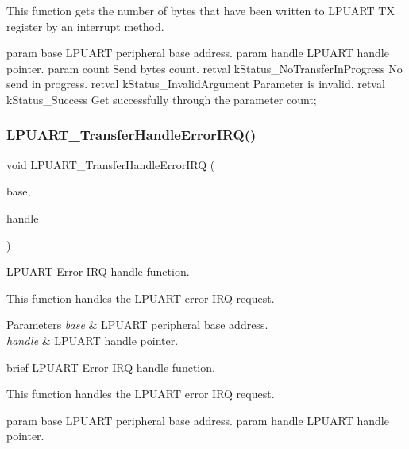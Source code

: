 This function gets the number of bytes that have been written to L\+P\+U\+A\+RT TX register by an interrupt method.

param base L\+P\+U\+A\+RT peripheral base address. param handle L\+P\+U\+A\+RT handle pointer. param count Send bytes count. retval k\+Status\+\_\+\+No\+Transfer\+In\+Progress No send in progress. retval k\+Status\+\_\+\+Invalid\+Argument Parameter is invalid. retval k\+Status\+\_\+\+Success Get successfully through the parameter {\ttfamily count}; \mbox{\label{group__lpuart__driver_ga21345340b5d8f90df6bb64acab0f870f}} 
\subsubsection{\texorpdfstring{LPUART\_TransferHandleErrorIRQ()}{LPUART\_TransferHandleErrorIRQ()}}
{\footnotesize\ttfamily void L\+P\+U\+A\+R\+T\+\_\+\+Transfer\+Handle\+Error\+I\+RQ (\begin{DoxyParamCaption}\item[{\mbox{\hyperlink{struct_l_p_u_a_r_t___type}{L\+P\+U\+A\+R\+T\+\_\+\+Type}} $\ast$}]{base,  }\item[{\mbox{\hyperlink{struct__lpuart__handle}{lpuart\+\_\+handle\+\_\+t}} $\ast$}]{handle }\end{DoxyParamCaption})}



L\+P\+U\+A\+RT Error I\+RQ handle function. 

This function handles the L\+P\+U\+A\+RT error I\+RQ request.


\begin{DoxyParams}{Parameters}
{\em base} & L\+P\+U\+A\+RT peripheral base address. \\
\hline
{\em handle} & L\+P\+U\+A\+RT handle pointer.\\
\hline
\end{DoxyParams}
brief L\+P\+U\+A\+RT Error I\+RQ handle function.

This function handles the L\+P\+U\+A\+RT error I\+RQ request.

param base L\+P\+U\+A\+RT peripheral base address. param handle L\+P\+U\+A\+RT handle pointer. \mbox{\label{group__lpuart__driver_gac81ce3c490d7185ab7e2d97963ae077e}} 
